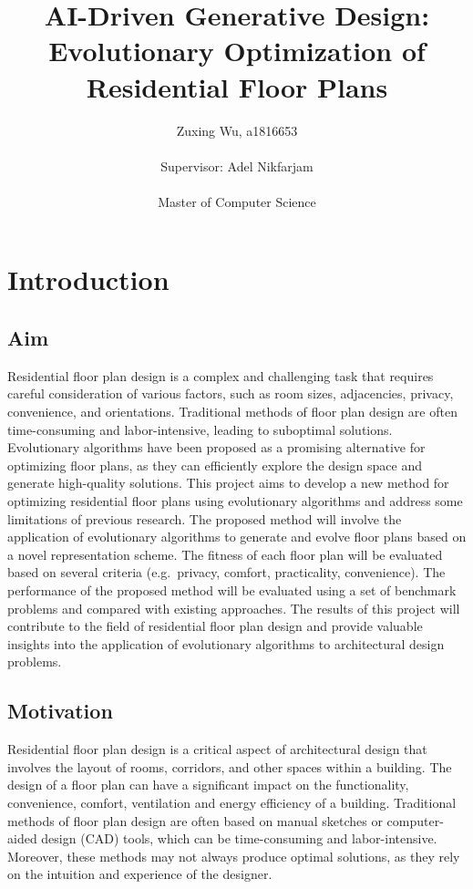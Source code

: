 \documentclass[]{article}
\title{\textbf{AI-Driven Generative Design: Evolutionary Optimization of Residential Floor Plans}}
\author{Zuxing Wu, a1816653\\ \\Supervisor: Adel Nikfarjam\\ \\Master of Computer Science}
\begin{document}
\maketitle\nonumber

\newpage\nonumber

\tableofcontents

\newpage


\section{Introduction}
\subsection{Aim}
Residential floor plan design is a complex and challenging task that requires careful consideration of various factors, such as room sizes, adjacencies, privacy, convenience, and orientations. Traditional methods of floor plan design are often time-consuming and labor-intensive, leading to suboptimal solutions. Evolutionary algorithms have been proposed as a promising alternative for optimizing floor plans, as they can efficiently explore the design space and generate high-quality solutions. This project aims to develop a new method for optimizing residential floor plans using evolutionary algorithms and address some limitations of previous research. The proposed method will involve the application of evolutionary algorithms to generate and evolve floor plans based on a novel representation scheme. The fitness of each floor plan will be evaluated based on several criteria (e.g.\ privacy, comfort, practicality, convenience). The performance of the proposed method will be evaluated using a set of benchmark problems and compared with existing approaches. The results of this project will contribute to the field of residential floor plan design and provide valuable insights into the application of evolutionary algorithms to architectural design problems.

\subsection{Motivation}
Residential floor plan design is a critical aspect of architectural design that involves the layout of rooms, corridors, and other spaces within a building. The design of a floor plan can have a significant impact on the functionality, convenience, comfort, ventilation and energy efficiency of a building. Traditional methods of floor plan design are often based on manual sketches or computer-aided design (CAD) tools, which can be time-consuming and labor-intensive. Moreover, these methods may not always produce optimal solutions, as they rely on the intuition and experience of the designer.
\end{document}
